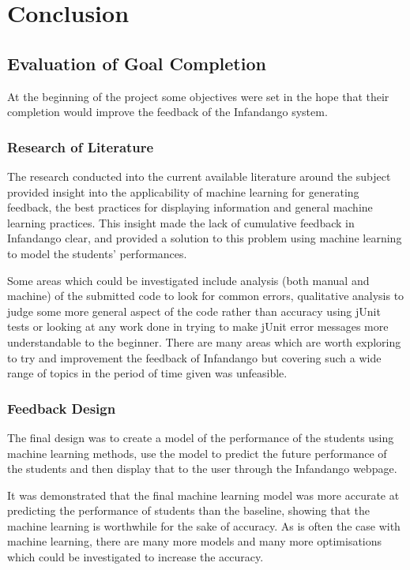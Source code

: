 \chapter{Conclusion}
\label{conclusion}
\section{Evaluation of Goal Completion}
At the beginning of the project some objectives were set in the hope that their completion would improve the feedback of the Infandango system. 

\subsection{Research of Literature}
The research conducted into the current available literature around the subject provided insight into the applicability of machine learning for generating feedback, the best practices for displaying information and general machine learning practices. This insight made the lack of cumulative feedback in Infandango clear, and provided a solution to this problem using machine learning to model the students' performances.

Some areas which could be investigated include analysis (both manual and machine) of the submitted code to look for common errors, qualitative analysis to judge some more general aspect of the code rather than accuracy using jUnit tests or looking at any work done in trying to make jUnit error messages more understandable to the beginner. There are many areas which are worth exploring to try and improvement the feedback of Infandango but covering such a wide range of topics in the period of time given was unfeasible. 

\subsection{Feedback Design}
The final design was to create a model of the performance of the students using machine learning methods, use the model to predict the future performance of the students and then display that to the user through the Infandango webpage. 

It was demonstrated that the final machine learning model was more accurate at predicting the performance of students than the baseline, showing that the machine learning is worthwhile for the sake of accuracy. As is often the case with machine learning, there are many more models and many more optimisations which could be investigated to increase the accuracy. 

